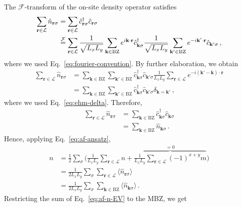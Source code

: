 \begin{tabproof}
	The $\mathcal{F}$-transform of the on-site density operator satisfies
	\begin{align}
		\sum_{\mathbf{r}\in\mathcal{L}} \hat n_{\mathbf{r}\sigma} &= \sum_{\mathbf{r}\in\mathcal{L}} \hat c_{\mathbf{r}\sigma}^\dagger \hat c_{\mathbf{r}\sigma} \nonumber \\
		&\stackrel{\mathcal{F}}{=} \sum_{\mathbf{r}\in\mathcal{L}}
		\frac{1}{\sqrt{L_x L_y}} \sum_{\mathbf{k} \in \mathrm{BZ}} e^{i \mathbf{k} \cdot \mathbf{r}} \hat c_{\mathbf{k}\sigma}^\dagger \frac{1}{\sqrt{L_x L_y}} \sum_{\mathbf{k}' \in \mathrm{BZ}} e^{-i \mathbf{k}' \cdot \mathbf{r}} \hat c_{\mathbf{k}'\sigma} \, , \label{eq:af-<n>-not0-int1}
	\end{align}
	where we used Eq.~\eqref{eq:fourier-convention}. By further elaboration, we obtain
	\[
	\begin{aligned}
		\sum_{\mathbf{r}\in\mathcal{L}} \hat n_{\mathbf{r}\sigma} &=\sum_{\mathbf{k} \in \mathrm{BZ}} \sum_{\mathbf{k}' \in \mathrm{BZ}} \hat c_{\mathbf{k}\sigma}^\dagger \hat c_{\mathbf{k}'\sigma} \frac{1}{L_x L_y} \sum_{\mathbf{r}\in\mathcal{L}} e^{-i (\mathbf{k}' - \mathbf{k}) \cdot \mathbf{r}} \nonumber \\
		&= \sum_{\mathbf{k} \in \mathrm{BZ}} \sum_{\mathbf{k}' \in \mathrm{BZ}} \hat c_{\mathbf{k}\sigma}^\dagger \hat c_{\mathbf{k}'\sigma} \delta_{\mathbf{k}=\mathbf{k}'} \, ,
	\end{aligned}
	\]
	where we used Eq.~\eqref{eq:ehm-delta}. Therefore,
	\begin{align}
		\sum_{\mathbf{r}\in\mathcal{L}} \hat n_{\mathbf{r}\sigma} &= \sum_{\mathbf{k} \in \mathrm{BZ}} \hat c_{\mathbf{k}\sigma}^\dagger \hat c_{\mathbf{k}\sigma} \nonumber \\
		&= \sum_{\mathbf{k} \in \mathrm{BZ}} \hat n_{\mathbf{k}\sigma} \, . \label{eq:af-<n>-not0}
	\end{align}
	Hence, applying Eq.~\eqref{eq:af-ansatz},
	\begin{align}
		n &= \frac{1}{2} \sum_\sigma \Bigg(
		\frac{1}{L_x L_y} \sum_{\mathbf{r}\in\mathcal{L}} n + \overbrace{\frac{1}{L_x L_y} \sum_{\mathbf{r}\in\mathcal{L}} (-1)^{x+y} m}^{=0}
		\Bigg) \nonumber \\
		&= \frac{1}{2L_x L_y} \sum_\sigma \sum_{\mathbf{r}\in\mathcal{L}} \langle \hat n_{\mathbf{r}\sigma} \rangle \nonumber \\
		&= \frac{1}{2L_x L_y} \sum_\sigma \sum_{\mathbf{k} \in \mathrm{BZ}} \langle \hat n_{\mathbf{k}\sigma} \rangle \, . \label{eq:af-n-EV}
	\end{align}
	Restricting the sum of Eq.~\eqref{eq:af-n-EV} to the MBZ, we get

\end{tabproof}
